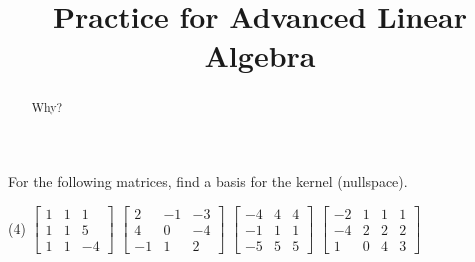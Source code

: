 \documentclass{ximera}
\title{Practice for Advanced Linear Algebra}
\begin{document}
\begin{abstract}
Why?
\end{abstract}
\maketitle


\begin{exercise}
    For the following matrices, find a basis for the kernel (nullspace).
    \begin{tasks}(4)
        \task
        $\begin{bmatrix}
            1 & 1 & 1 \\
            1 & 1 & 5 \\
            1 & 1 & -4
        \end{bmatrix}$
        \task
        $\begin{bmatrix}
            2 & -1 & -3 \\
            4 & 0 & -4 \\
            -1 & 1 & 2
        \end{bmatrix}$
        \task
        $\begin{bmatrix}
            -4 & 4 & 4 \\
            -1 & 1 & 1 \\
            -5 & 5 & 5
        \end{bmatrix}$
        \task
        $\begin{bmatrix}
            -2 & 1 & 1 & 1 \\
            -4 & 2 & 2 & 2 \\
            1 & 0 & 4 & 3
        \end{bmatrix}$
    \end{tasks}
\end{exercise}
\end{document}
